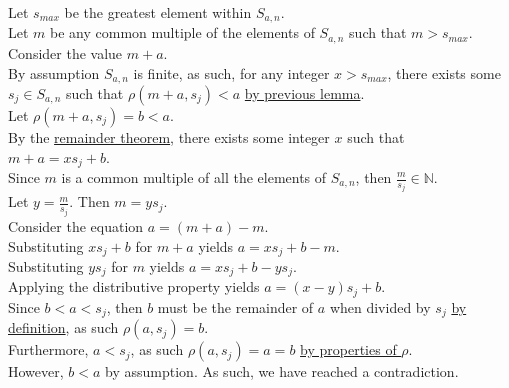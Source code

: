 \documentclass[a4paper,12pt]{article}
\begin{document}
\noindent Let $s_{max}$ be the greatest element within $S_{a, n}$.\\

\noindent Let $m$ be any common multiple of the elements of $S_{a, n}$ such that $m > s_{max}$.\\

\noindent Consider the value $m + a$.\\

\noindent By assumption $S_{a, n}$ is finite, as such, for any integer $x > s_{max}$, there exists some $s_j \in S_{a,n}$ such that $\rho(m + a, s_j) < a$ \hyperlink{lemma:exists_element_less_than_x}{by previous lemma}.\\

\noindent Let $\rho(m + a, s_j) = b < a$.\\

\noindent By the \hyperlink{theorem:remainder_theorem}{remainder theorem}, there exists some integer $x$ such that\\ $m + a = xs_j + b$.\\

\noindent Since $m$ is a common multiple of all the elements of $S_{a,n}$, then $\frac{m}{s_j} \in \mathbb{N}$.\\

\noindent Let $y = \frac{m}{s_j}$. Then $m = ys_j$.\\

\noindent Consider the equation $a = (m + a) - m$.\\

\noindent Substituting $xs_j + b$ for $m + a$ yields $a = xs_j + b - m$.\\

\noindent Substituting $ys_j$ for $m$ yields $a = xs_j + b - ys_j$.\\

\noindent Applying the distributive property yields $a = (x - y)s_j + b$.\\

\noindent Since $b < a < s_j$, then $b$ must be the remainder of $a$ when divided by $s_j$ \hyperlink{theorem:remainder_theorem}{by definition}, as such $\rho(a, s_j) = b$.\\

\noindent Furthermore, $a < s_j$, as such $\rho(a, s_j) = a = b$ \hyperlink{remainder_properties}{by properties of $\rho$}.\\

\noindent However, $b < a$ by assumption. As such, we have reached a contradiction.\\
\end{document}
